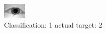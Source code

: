 \begin{figure}[h!]
\begin{center}
\includegraphics[width=0.60\columnwidth]{figures/ID942_class_1_target_2.png}
\end{center}
\caption{ Classification: 1 actual target: 2}
\label{fig:ID942_class_1_target_2}
\end{figure}
